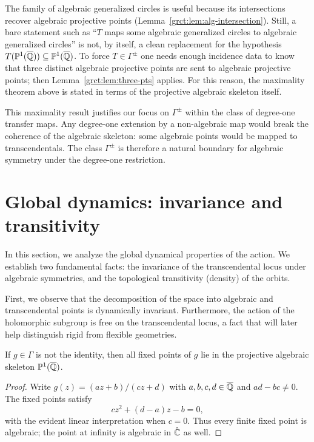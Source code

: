 \begin{remark}\label{grct:rem:real-forms-skeleton}
	The family of algebraic generalized circles is useful because its intersections recover algebraic projective points (Lemma~\ref{grct:lem:alg-intersection}). Still, a bare statement such as ``$T$ maps some algebraic generalized circles to algebraic generalized circles'' is not, by itself, a clean replacement for the hypothesis $T(\mathbb{P}^{1}(\overline{\mathbb{Q}}))\subseteq\mathbb{P}^{1}(\overline{\mathbb{Q}})$. To force $T\in\Gamma^{\pm}$ one needs enough incidence data to know that three distinct algebraic projective points are sent to algebraic projective points; then Lemma~\ref{grct:lem:three-pts} applies. For this reason, the maximality theorem above is stated in terms of the projective algebraic skeleton itself.
\end{remark}

\begin{remark}\label{grct:rem:why-g}
	This maximality result justifies our focus on $\Gamma^{\pm}$ within the class of degree-one transfer maps. Any degree-one extension by a non-algebraic map would break the coherence of the algebraic skeleton: some algebraic points would be mapped to transcendentals. The class $\Gamma^{\pm}$ is therefore a natural boundary for algebraic symmetry under the degree-one restriction.
\end{remark}

\section{Global dynamics: invariance and transitivity}\label{grct:sec:group-actions}

In this section, we analyze the global dynamical properties of the action. We establish two fundamental facts: the invariance of the transcendental locus under algebraic symmetries, and the topological transitivity (density) of the orbits.

First, we observe that the decomposition of the space into algebraic and transcendental points is dynamically invariant. Furthermore, the action of the holomorphic subgroup is free on the transcendental locus, a fact that will later help distinguish rigid from flexible geometries.

\begin{lemma}\label{grct:lem:no-holo-stab}
	If $g\in\Gamma$ is not the identity, then all fixed points of $g$ lie in the projective algebraic skeleton $\mathbb{P}^{1}(\overline{\mathbb{Q}})$.
\end{lemma}
\begin{proof}
	Write $g(z)=(az+b)/(cz+d)$ with $a,b,c,d\in\overline{\mathbb{Q}}$ and $ad-bc\ne0$. The fixed points satisfy
	\[
		cz^2+(d-a)z-b=0,
	\]
	with the evident linear interpretation when $c=0$. Thus every finite fixed point is algebraic; the point at infinity is algebraic in $\hat{\mathbb{C}}$ as well.
\end{proof}

